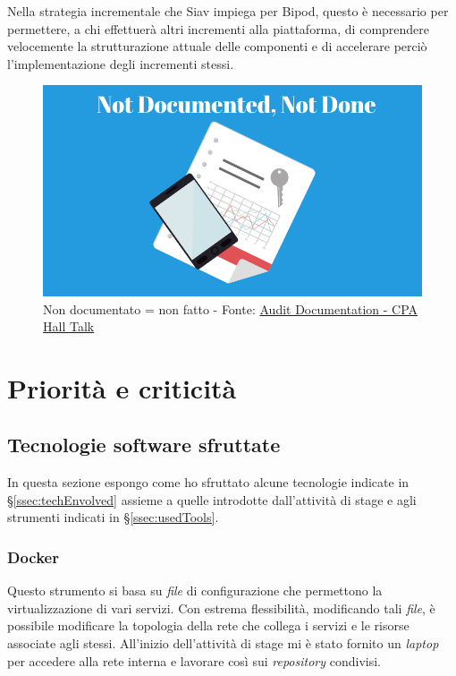 Nella strategia incrementale che Siav impiega per Bipod, questo è necessario per permettere, a chi effettuerà altri incrementi alla piattaforma, di comprendere velocemente la strutturazione attuale delle componenti e di accelerare perciò l'implementazione degli incrementi stessi.
\vspace{45px}
\begin{figure}[H]
    \centering
    \includegraphics[width=0.75\columnwidth]{immagini/Not-documented-not-done.png}
    \caption{Non documentato = non fatto - Fonte: \href{https://cpahalltalk.com/audit-documentation/}{Audit Documentation - CPA Hall Talk}}
    \label{fig:notDone}
\end{figure}
\newpage
\section{Priorità e criticità}
\subsection{Tecnologie software sfruttate}
In questa sezione espongo come ho sfruttato alcune tecnologie indicate in \S\ref{ssec:techEnvolved} assieme a quelle introdotte dall'attività di stage e agli strumenti indicati in \S\ref{ssec:usedTools}.
\subsubsection{Docker}
\label{ssec:docker}
Questo strumento si basa su \textit{file} di configurazione che permettono la virtualizzazione di vari servizi. Con estrema flessibilità, modificando tali \textit{file}, è possibile modificare la topologia della rete che collega i servizi e le risorse associate agli stessi. All'inizio dell'attività di stage mi è stato fornito un \textit{laptop} per accedere alla rete interna e lavorare così sui \textit{repository} condivisi.


